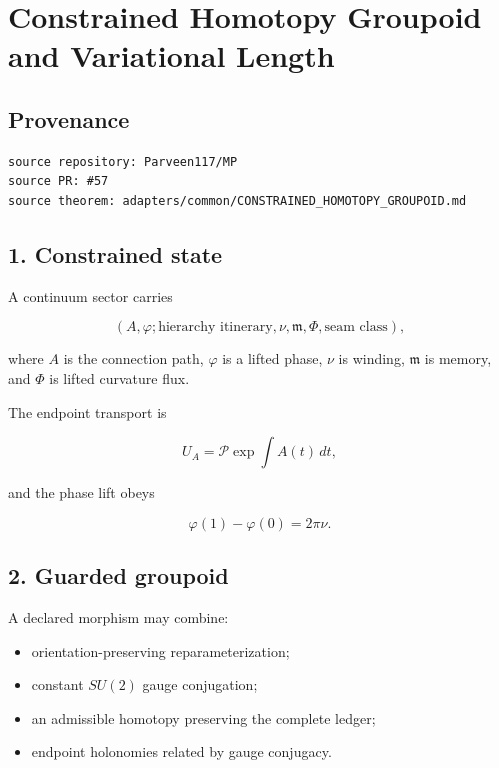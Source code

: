 \hypertarget{constrained-homotopy-groupoid-and-variational-length}{%
\chapter{Constrained Homotopy Groupoid and Variational Length}\label{constrained-homotopy-groupoid-and-variational-length}}

\hypertarget{provenance}{%
\section{Provenance}\label{provenance}}

\begin{verbatim}
source repository: Parveen117/MP
source PR: #57
source theorem: adapters/common/CONSTRAINED_HOMOTOPY_GROUPOID.md
\end{verbatim}

\hypertarget{constrained-state}{%
\section{1. Constrained state}\label{constrained-state}}

A continuum sector carries

\[
(A,\varphi;
\text{hierarchy itinerary},
\nu,
\mathfrak m,
\Phi,
\text{seam class}),
\]

where \(A\) is the connection path, \(\varphi\) is a lifted phase, \(\nu\) is winding, \(\mathfrak m\) is memory, and \(\Phi\) is lifted curvature flux.

The endpoint transport is

\[
U_A=\mathcal P\exp\!\int A(t)\,dt,
\]

and the phase lift obeys

\[
\varphi(1)-\varphi(0)=2\pi\nu.
\]

\hypertarget{guarded-groupoid}{%
\section{2. Guarded groupoid}\label{guarded-groupoid}}

A declared morphism may combine:

\begin{itemize}
\tightlist
\item
  orientation-preserving reparameterization;
\item
  constant \(SU(2)\) gauge conjugation;
\item
  an admissible homotopy preserving the complete ledger;
\item
  endpoint holonomies related by gauge conjugacy.
\end{itemize}


